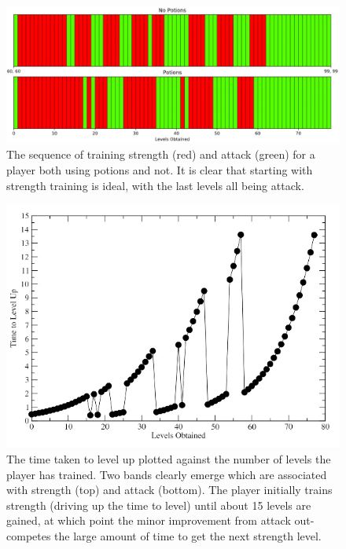 	\begin{figure}
		\centering
		\includegraphics[width=\linewidth]{img/combat/training_order_sequence.png}
		\caption{
			The sequence of training strength (red) and attack (green) for a player both using potions and not. It is clear that starting with strength training is ideal, with the last levels all being attack.
		}
		\label{fig:training_order_sequence}
	\end{figure}

	\begin{figure}
		\centering
		\includegraphics[width=\linewidth]{img/combat/training_graph.png}
		\caption{
			The time taken to level up plotted against the number of levels the player has trained. Two bands clearly emerge which are associated with strength (top) and attack (bottom). The player initially trains strength (driving up the time to level) until about 15 levels are gained, at which point the minor improvement from attack out-competes the large amount of time to get the next strength level. 
		}
		\label{fig:training_graph}
	\end{figure}

